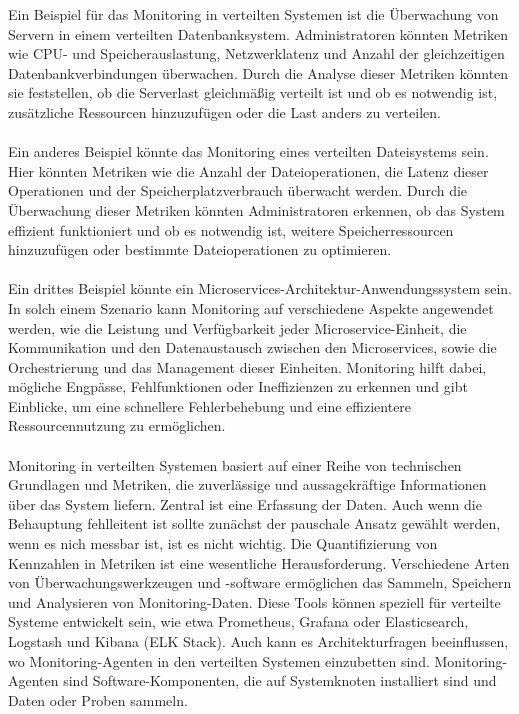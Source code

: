 Ein Beispiel für das Monitoring in verteilten Systemen ist die Überwachung von Servern in einem verteilten Datenbanksystem. Administratoren könnten Metriken wie CPU- und Speicherauslastung, Netzwerklatenz und Anzahl der gleichzeitigen Datenbankverbindungen überwachen. Durch die Analyse dieser Metriken könnten sie feststellen, ob die Serverlast gleichmäßig verteilt ist und ob es notwendig ist, zusätzliche Ressourcen hinzuzufügen oder die Last anders zu verteilen.
\\\\
Ein anderes Beispiel könnte das Monitoring eines verteilten Dateisystems sein. Hier könnten Metriken wie die Anzahl der Dateioperationen, die Latenz dieser Operationen und der Speicherplatzverbrauch überwacht werden. Durch die Überwachung dieser Metriken könnten Administratoren erkennen, ob das System effizient funktioniert und ob es notwendig ist, weitere Speicherressourcen hinzuzufügen oder bestimmte Dateioperationen zu optimieren.
\\\\
Ein drittes Beispiel könnte ein Microservices-Architektur-Anwendungssystem sein. In solch einem Szenario kann Monitoring auf verschiedene Aspekte angewendet werden, wie die Leistung und Verfügbarkeit jeder Microservice-Einheit, die Kommunikation und den Datenaustausch zwischen den Microservices, sowie die Orchestrierung und das Management dieser Einheiten. Monitoring hilft dabei, mögliche Engpässe, Fehlfunktionen oder Ineffizienzen zu erkennen und gibt Einblicke, um eine schnellere Fehlerbehebung und eine effizientere Ressourcennutzung zu ermöglichen.
\\\\
Monitoring in verteilten Systemen basiert auf einer Reihe von technischen Grundlagen und Metriken, die zuverlässige und aussagekräftige Informationen über das System liefern. Zentral ist eine Erfassung der Daten. Auch wenn die Behauptung fehlleitent ist sollte zunächst der pauschale Ansatz gewählt werden, wenn es nich messbar ist, ist es nicht wichtig. Die Quantifizierung von Kennzahlen in Metriken ist eine wesentliche Herausforderung. Verschiedene Arten von Überwachungswerkzeugen und -software ermöglichen das Sammeln, Speichern und Analysieren von Monitoring-Daten. Diese Tools können speziell für verteilte Systeme entwickelt sein, wie etwa Prometheus, Grafana oder Elasticsearch, Logstash und Kibana (ELK Stack).
Auch kann es Architekturfragen beeinflussen, wo Monitoring-Agenten in den verteilten Systemen einzubetten sind. Monitoring-Agenten sind Software-Komponenten, die auf Systemknoten installiert sind und Daten  oder Proben sammeln. 

